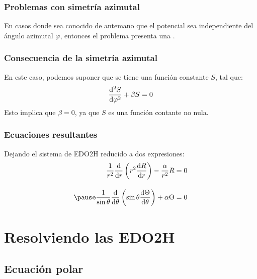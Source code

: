 \documentclass[12pt]{beamer}
\begin{document}
\begin{frame}
\frametitle{Problemas con simetría azimutal}
En casos donde sea conocido de antemano que el potencial sea independiente del ángulo azimutal $\varphi$, entonces el problema presenta una .
\end{frame}
\begin{frame}
\frametitle{Consecuencia de la simetría azimutal}
En este caso, podemos suponer que se tiene una función constante $S$, tal que:
\begin{align*}
\dv[2]{S}{\varphi} + \beta S = 0
\end{align*}
\pause
Esto implica que $\beta = 0$, ya que $S$ es una función contante no nula.
\end{frame}
\begin{frame}
\frametitle{Ecuaciones resultantes}
Dejando el sistema de EDO2H reducido a dos expresiones:
\begin{eqnarray}
\begin{aligned}
\dfrac{1}{r^{2}} \dv{r} \left( r^{2} \dv{R}{r} \right) - \dfrac{\alpha}{r^{2}} R &= 0 \\[1em] \pause
\dfrac{1}{\sin \theta} \dv{\theta} \left( \sin \theta \dv{\Theta}{\theta} \right) + \alpha \Theta &= 0
\end{aligned}
\label{eq:ecuacion_26_02}
\end{eqnarray}
\end{frame}

\section{Resolviendo las EDO2H}
\subsection{Ecuación polar}
\end{document}
